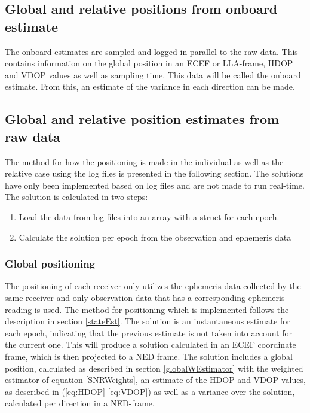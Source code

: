 
\subsection{Global and relative positions from onboard estimate}
The onboard estimates are sampled and logged in parallel to the raw data. This contains information on the global position in an ECEF or LLA-frame, HDOP and VDOP values as well as sampling time. This data will be called the onboard estimate. From this, an estimate of the variance in each direction can be made.
\subsection{Global and relative position estimates from raw data}
The method for how the positioning is made in the individual as well as the relative case using the log files is presented in the following section. The solutions have only been implemented based on log files and are not made to run real-time.
The solution is calculated in two steps: 
\begin{enumerate}
\item Load the data from log files into an array with a struct for each epoch. 
\item Calculate the solution per epoch from the observation and ephemeris data
\end{enumerate} 
\subsubsection{Global positioning}
The positioning of each receiver only utilizes the ephemeris data collected by the same receiver and only observation data that has a corresponding ephemeris reading is used. The method for positioning which is implemented follows the description in section \ref{stateEst}. The solution is an instantaneous estimate for each epoch, indicating that the previous estimate is not taken into account for the current one. This will produce a solution calculated in an ECEF coordinate frame, which is then projected to a NED frame. The solution includes a global position, calculated as described in section \ref{globalWEstimator} with the weighted estimator of equation \ref{SNRWeights}, an estimate of the HDOP and VDOP values, as described in (\ref{eq:HDOP}-\ref{eq:VDOP}) as well as a variance over the solution, calculated per direction in a NED-frame.

